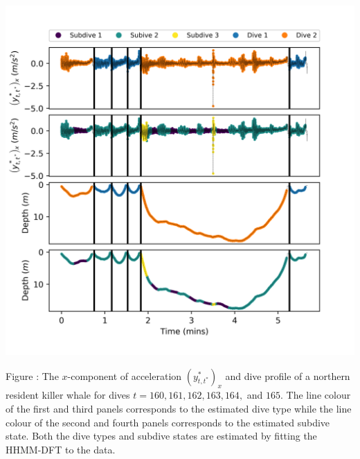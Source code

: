 \documentclass{article}
\begin{document}
        \begin{center}
        \includegraphics[width=6in]{../Plots/HHMM_decoded_dives.png}
        \end{center}
        
        \noindent Figure : The $x$-component of acceleration $\left(y^*_{t,t^*}\right)_x$ and dive profile of a northern resident killer whale for dives $t = 160,161,162,163,164,$ and $165$. The line colour of the first and third panels corresponds to the estimated dive type while the line colour of the second and fourth panels corresponds to the estimated subdive state. Both the dive types and subdive states are estimated by fitting the HHMM-DFT to the data.
        \addtocounter{fignum}{1}
        
\end{document}
